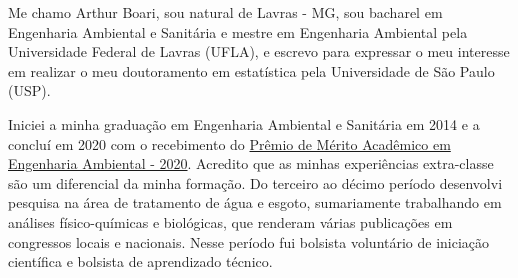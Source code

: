 \documentclass[12pt,a4paper]{article}
\begin{document}
	
	
	Me chamo Arthur Boari, sou natural de Lavras - MG, sou bacharel em Engenharia Ambiental e Sanitária e mestre em Engenharia Ambiental pela Universidade Federal de Lavras (UFLA), e escrevo para expressar o meu interesse em realizar o meu doutoramento em estatística pela Universidade de São Paulo (USP).
	
	Iniciei a minha graduação em Engenharia Ambiental e Sanitária em 2014 e a concluí em 2020 com o recebimento do \href{https://ufla.br/noticias/ensino/14064-etapa-concluida-mais-de-500-novos-profissionais-formados-pela-ufla}{Prêmio de Mérito Acadêmico em Engenharia Ambiental - 2020}. Acredito que as minhas experiências extra-classe são um diferencial da minha formação. Do terceiro ao décimo período desenvolvi pesquisa na área de tratamento de água e esgoto, sumariamente trabalhando em análises físico-químicas e biológicas, que renderam várias publicações em congressos locais e nacionais. Nesse período fui bolsista voluntário de iniciação científica e bolsista de aprendizado técnico.
	
\end{document}
